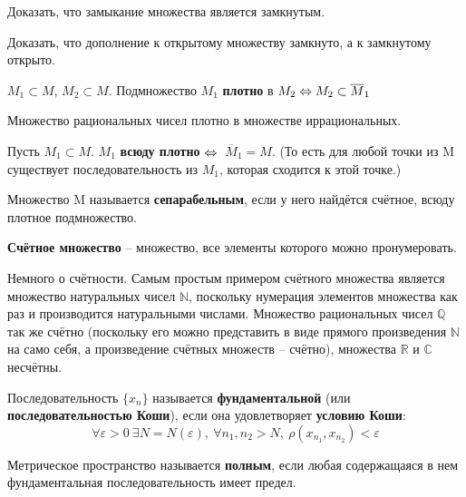 \documentclass[12pt]{article}
\begin{document}
	\exc Доказать, что замыкание множества является замкнутым.
	
	\exc Доказать, что дополнение к открытому множеству замкнуто, а к замкнутому открыто.
	
	\begin{defi}
		$M_1 \subset M$, $M_2 \subset M$. Подмножество $M_1$ \textbf{плотно} в $M_2 \Leftrightarrow M_2 \subset \overline{M}_1$
	\end{defi}
	
	\example Множество рациональных чисел плотно в множестве иррациональных.
	
	\begin{defi}
		Пусть $M_1 \subset M$. $M_1$ \textbf{всюду плотно} $\Leftrightarrow$ $\
		\overline{M}_1 = M$. (То есть для любой точки из M существует 
		последовательность из $M_1$, которая сходится к этой точке.)
	\end{defi}
	
	\begin{defi}
		Множество M называется \textbf{сепарабельным}, если у него найдётся счётное, всюду плотное подмножество.
	\end{defi}
	
	\begin{defi}
		\textbf{Счётное множество} -- множество, все элементы которого можно пронумеровать.
	\end{defi}

	{\color{gray} Немного о счётности. Самым простым примером счётного множества является множество натуральных чисел $\mathbb{N}$, поскольку нумерация элементов множества как раз и производится натуральными числами. Множество рациональных чисел $\mathbb{Q}$ так же счётно (поскольку его можно представить в виде прямого произведения $\mathbb{N}$ на само себя, а произведение счётных множеств -- счётно), множества $\mathbb{R}$ и $\mathbb{C}$ несчётны.}
	
	\begin{defi}
		Последовательность $\{x_n\}$ называется \textbf{фундаментальной} (или \textbf{последовательностью Коши}), если она 
		удовлетворяет \textbf{условию Коши}:
		$$\forall \varepsilon > 0 ~\exists N = N(\varepsilon),~ \forall n_1, n_2 > N,~ \rho(x_{n_1}, x_{n_2}) < \varepsilon$$
	\end{defi}

	\begin{defi}
		Метрическое пространство называется \textbf{полным}, если любая содержащаяся в нем фундаментальная последовательность имеет 
		предел.
	\end{defi}
	
\end{document}
